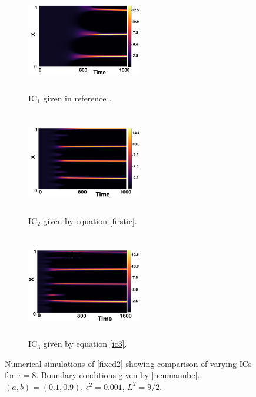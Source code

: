 \begin{figure}[H]
    \centering
    \begin{subfigure}[t]{0.32\textwidth}
        \centering
        \includegraphics[width=5cm,height=4.5cm]{gaff8.png}
        \caption{$\text{IC}_1$ given in reference \cite{gaffmonk}.}
        \label{}
    \end{subfigure}
    \hfill
    \begin{subfigure}[t]{0.32\textwidth}
        \centering
        \includegraphics[width=5cm,height=4.5cm]{ic28.png}
        \caption{$\text{IC}_2$ given by equation \eqref{firstic}.}
        \label{}
    \end{subfigure}
    \hfill
    \begin{subfigure}[t]{0.32\textwidth}
        \centering
        \includegraphics[width=5cm,height=4.5cm]{ic38.png}
        \caption{$\text{IC}_3$ given by equation \eqref{ic3}.}
        \label{}
    \end{subfigure}
    \caption{Numerical simulations of \eqref{fixed2} showing comparison of varying ICs for $\tau=8$. Boundary conditions given by \eqref{neumannbc}. $(a,b)=(0.1,0.9)$, $\epsilon^2=0.001$, $L^2=9/2$.}
    \label{fig:figtau8}
\end{figure}

